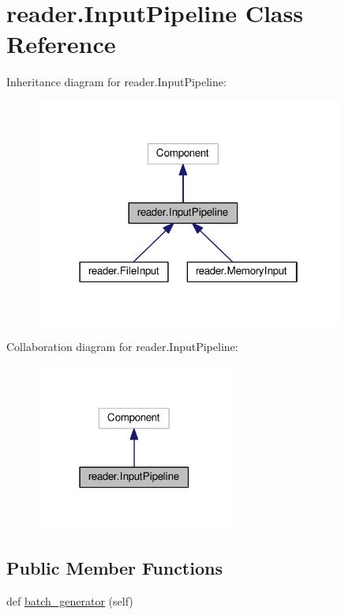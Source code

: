 \hypertarget{classreader_1_1InputPipeline}{}\section{reader.\+Input\+Pipeline Class Reference}
\label{classreader_1_1InputPipeline}


Inheritance diagram for reader.\+Input\+Pipeline\+:
\nopagebreak
\begin{figure}[H]
\begin{center}
\leavevmode
\includegraphics[width=286pt]{classreader_1_1InputPipeline__inherit__graph}
\end{center}
\end{figure}


Collaboration diagram for reader.\+Input\+Pipeline\+:
\nopagebreak
\begin{figure}[H]
\begin{center}
\leavevmode
\includegraphics[width=183pt]{classreader_1_1InputPipeline__coll__graph}
\end{center}
\end{figure}
\subsection*{Public Member Functions}
\begin{DoxyCompactItemize}
\item 
def \hyperlink{classreader_1_1InputPipeline_af8d04604e1e29d9d9ad68d249e10e657}{batch\+\_\+generator} (self)
\end{DoxyCompactItemize}


